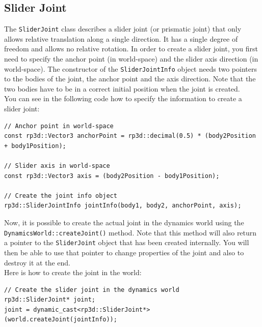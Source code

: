 \documentclass[a4paper,12pt]{article}
\begin{document}
    \subsection{Slider Joint}

    The \texttt{SliderJoint} class describes a slider joint (or prismatic joint) that only allows relative translation along a single direction. It has a single degree of freedom and allows no
    relative rotation. In order to create a slider joint, you first need to specify the anchor point (in world-space) and the slider axis direction (in world-space). The constructor of the
    \texttt{SliderJointInfo} object needs two pointers to the bodies of the joint, the anchor point and the axis direction. Note that the two bodies have to be in a correct initial position when
    the joint is created. \\

    You can see in the following code how to specify the information to create a slider joint: \\

    \begin{lstlisting}
// Anchor point in world-space
const rp3d::Vector3 anchorPoint = rp3d::decimal(0.5) * (body2Position + body1Position);

// Slider axis in world-space
const rp3d::Vector3 axis = (body2Position - body1Position);

// Create the joint info object
rp3d::SliderJointInfo jointInfo(body1, body2, anchorPoint, axis);
  \end{lstlisting}

    \vspace{0.6cm}

    Now, it is possible to create the actual joint in the dynamics world using the \texttt{DynamicsWorld::createJoint()} method.
    Note that this method will also return a pointer to the \texttt{SliderJoint} object that has been created internally. You will then
    be able to use that pointer to change properties of the joint and also to destroy it at the end. \\

    Here is how to create the joint in the world: \\

    \begin{lstlisting}
// Create the slider joint in the dynamics world
rp3d::SliderJoint* joint;
joint = dynamic_cast<rp3d::SliderJoint*>(world.createJoint(jointInfo));
  \end{lstlisting}
\end{document}
